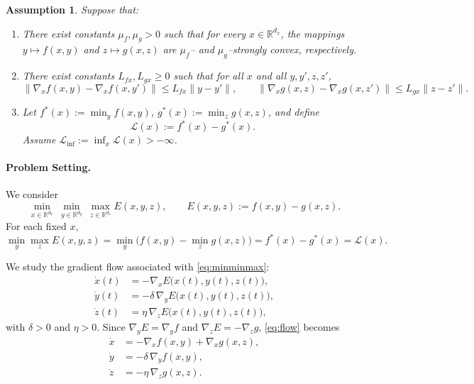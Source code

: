 \documentclass{article}
\newtheorem{assumption}[theorem]{Assumption}
\newcommand{\1}{\mathbf{1}}
\begin{document}
\begin{assumption}\label{ass:6} Suppose that:
\begin{enumerate}
\item There exist constants $\mu_f,\mu_g>0$ such that for every $x\in\mathbb R^{d_x}$,
the mappings $y\mapsto f(x,y)$ and $z\mapsto g(x,z)$ are $\mu_f$-- and $\mu_g$--strongly convex,
respectively.


\item There exist constants $L_{fx},L_{gx}\ge 0$ such that for all $x$ and all $y,y',z,z'$,
\[
\|\nabla_x f(x,y)-\nabla_x f(x,y')\|\le L_{fx}\|y-y'\|,
\qquad
\|\nabla_x g(x,z)-\nabla_x g(x,z')\|\le L_{gx}\|z-z'\|.
\]

\item Let $f^*(x):=\min_y f(x,y)$, $g^*(x):=\min_z g(x,z)$, and define
\[
\mathcal L(x):=f^*(x)-g^*(x).
\]
Assume $\mathcal L_{\inf}:=\inf_x \mathcal L(x)>-\infty$.
\end{enumerate}

\end{assumption}


\paragraph{Problem Setting.}

We consider
\begin{equation}\label{eq:minminmax}
\min_{x\in\mathbb R^{d_x}}\ \min_{y\in\mathbb R^{d_y}}\ \max_{z\in\mathbb R^{d_z}}
E(x,y,z),
\qquad
E(x,y,z):=f(x,y)-g(x,z).
\end{equation}
For each fixed $x$, 
\[
\min_y\max_z E(x,y,z)
=\min_y\bigl(f(x,y)-\min_z g(x,z)\bigr)
=f^*(x)-g^*(x)
=\mathcal L(x).
\]

\noindent We study the gradient flow associated with \eqref{eq:minminmax}:
\begin{equation}\label{eq:flow}
\begin{aligned}
\dot x(t) &= -\nabla_x E\bigl(x(t),y(t),z(t)\bigr),\\
\dot y(t) &= -\delta\,\nabla_y E\bigl(x(t),y(t),z(t)\bigr),\\
\dot z(t) &= \eta\,\nabla_z E\bigl(x(t),y(t),z(t)\bigr),
\end{aligned}
\end{equation}
with $\delta>0$ and $\eta>0$.
Since $\nabla_y E=\nabla_y f$ and $\nabla_z E=-\nabla_z g$, \eqref{eq:flow} becomes
\begin{equation}\label{eq:flow-expanded}
\begin{aligned}
\dot x &= -\nabla_x f(x,y) + \nabla_x g(x,z),\\
\dot y &= -\delta\,\nabla_y f(x,y),\\
\dot z &= -\eta\,\nabla_z g(x,z).
\end{aligned}
\end{equation}
\end{document}
